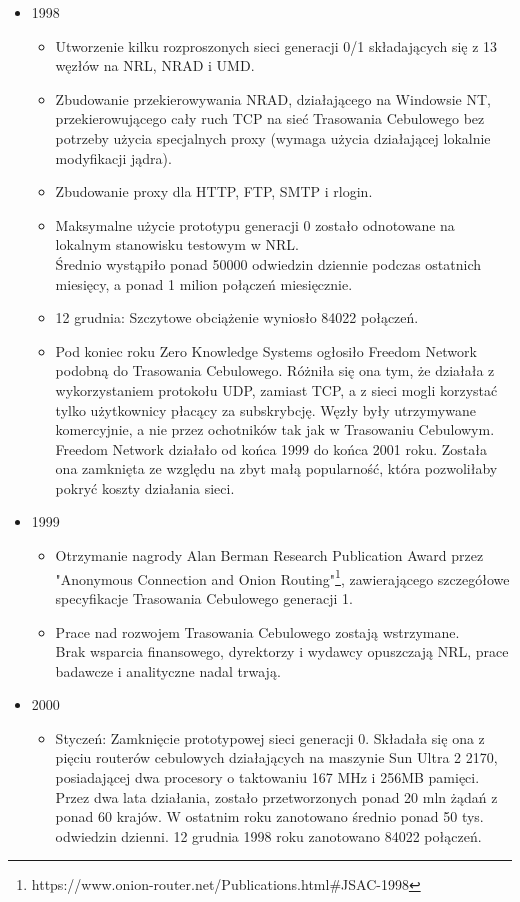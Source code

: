 \begin{itemize}
  \item 1998
  \begin{itemize}
   \item Utworzenie kilku rozproszonych sieci generacji 0/1 składających się z 13 węzłów na NRL, NRAD i UMD.
   \item Zbudowanie przekierowywania NRAD, działającego na Windowsie NT, przekierowującego cały ruch TCP na sieć Trasowania Cebulowego bez potrzeby użycia specjalnych proxy (wymaga użycia działającej lokalnie modyfikacji jądra).
   \item Zbudowanie proxy dla HTTP, FTP, SMTP i rlogin.
   \item Maksymalne użycie prototypu generacji 0 zostało odnotowane na lokalnym stanowisku testowym w NRL. \\Średnio wystąpiło ponad 50000 odwiedzin dziennie podczas ostatnich miesięcy, a ponad 1 milion połączeń miesięcznie.
    \item 12 grudnia: Szczytowe obciążenie wyniosło 84022 połączeń.
    \item Pod koniec roku Zero Knowledge Systems ogłosiło Freedom Network podobną do Trasowania Cebulowego. Różniła się ona tym, że działała z wykorzystaniem protokołu UDP, zamiast TCP, a z sieci mogli korzystać tylko użytkownicy płacący za subskrybcję. Węzły były utrzymywane komercyjnie, a nie przez ochotników tak jak w Trasowaniu Cebulowym. Freedom Network działało od końca 1999 do końca 2001 roku. Została ona zamknięta ze względu na zbyt małą popularność, która pozwoliłaby pokryć koszty działania sieci.
   \end{itemize}
   
  \item 1999
  \begin{itemize}
   \item Otrzymanie nagrody Alan Berman Research Publication Award przez "Anonymous Connection and Onion Routing"\footnote{https://www.onion-router.net/Publications.html\#JSAC-1998}, zawierającego szczegółowe specyfikacje Trasowania Cebulowego generacji 1.
   \item Prace nad rozwojem Trasowania Cebulowego zostają wstrzymane. \\Brak wsparcia finansowego, dyrektorzy i wydawcy opuszczają NRL, prace badawcze i analityczne nadal trwają.
  \end{itemize}
  
  \item 2000
  \begin{itemize}
   \item Styczeń: Zamknięcie prototypowej sieci generacji 0. Składała się ona z pięciu routerów cebulowych działających na maszynie Sun Ultra 2 2170, posiadającej dwa procesory o taktowaniu 167 MHz i 256MB pamięci. Przez dwa lata działania, zostało przetworzonych ponad 20 mln żądań z ponad 60 krajów. W ostatnim roku zanotowano średnio ponad 50 tys. odwiedzin dzienni. 12 grudnia 1998 roku zanotowano 84022 połączeń.
  \end{itemize}
  

\end{itemize}
